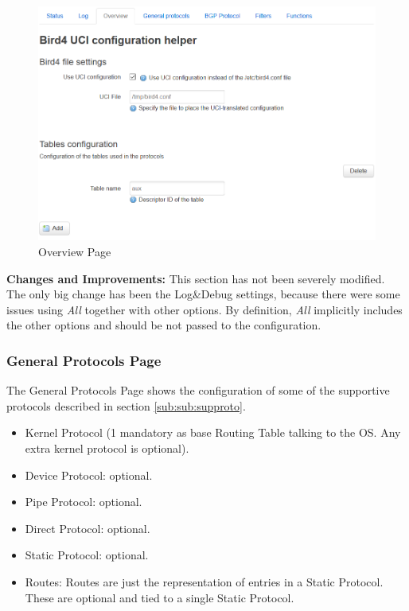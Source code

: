 \begin{figure}[H]
    \centering
    \includegraphics[width=\textwidth]{images/bird0.3/overview}
    \caption{Overview Page}
    \label{fig:overview}
\end{figure}

\textbf{Changes and Improvements:}
This section has not been severely modified. The only big change has been the Log\&Debug settings, because there were some issues using \textit{All} together with other options. By definition, \textit{All} implicitly includes the other options and should be not passed to the configuration.

\subsubsection{General Protocols Page}
The General Protocols Page shows the configuration of some of the supportive protocols described in section \ref{sub:sub:supproto}.

\begin{itemize}
    \item Kernel Protocol (1 mandatory as base Routing Table talking to the OS. Any extra kernel protocol is optional).
    \item Device Protocol: optional.
    \item Pipe Protocol: optional.
    \item Direct Protocol: optional.
    \item Static Protocol: optional.
    \item Routes: Routes are just the representation of entries in a Static Protocol. These are optional and tied to a single Static Protocol.
\end{itemize}

